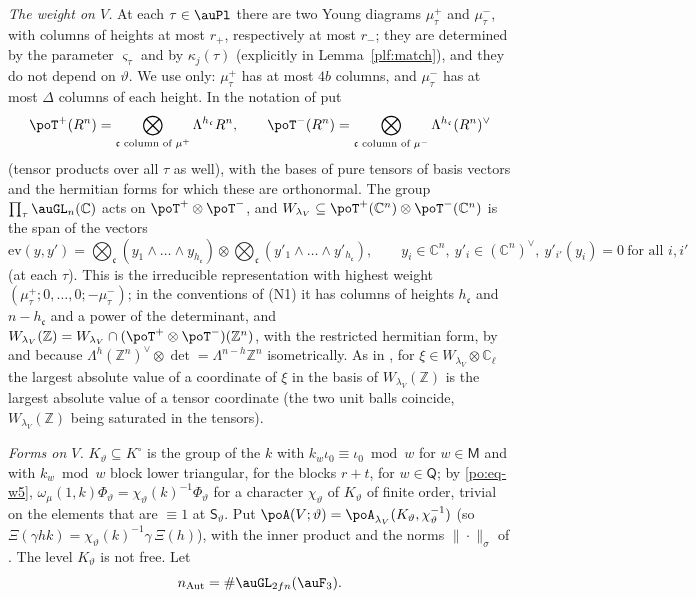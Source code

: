\documentclass[10pt]{amsart}
\theoremstyle{definition}
\theoremstyle{remark}
\newcommand{\C}{\mathbb C}
\newcommand{\Z}{\mathbb Z}
\begin{document}
\emph{The weight on $V$.} At each $\tau\in\auPl$ there are two Young diagrams $\mu^+_\tau$ and
$\mu^-_\tau$, with columns of heights at most $r_+$, respectively at most $r_-$; they are
determined by the parameter $\varsigma_\tau$ and by $\kappa_j(\tau)$ (explicitly in Lemma~\ref{plf:match}), and they do not depend on
$\vartheta$. We use only: $\mu^+_\tau$ has at most $4b$ columns, and $\mu^-_\tau$ has at most
$\Delta$ columns of each height. In the notation of {\cite[\S5.2.6]{P49}} put
\[
\poT^+(R^n)=\bigotimes_{\mathfrak c\text{ column of }\mu^+}\Lambda^{h_{\mathfrak c}}R^n,\qquad
\poT^-(R^n)=\bigotimes_{\mathfrak c\text{ column of }\mu^-}\Lambda^{h_{\mathfrak c}}(R^n)^\vee
\]
(tensor products over all $\tau$ as well), with the bases of pure tensors of basis vectors and the
hermitian forms for which these are orthonormal. The group $\prod_\tau\auGL_n(\C)$ acts on
$\poT^+\otimes\poT^-$, and $W_{\lambda_V}\subseteq\poT^+(\C^n)\otimes\poT^-(\C^n)$ is the span of
the vectors
\begin{equation}\label{po:eq-ev}
\mathrm{ev}(y,y')=\bigotimes_{\mathfrak c}(y_1\wedge\dots\wedge y_{h_{\mathfrak c}})\otimes
\bigotimes_{\mathfrak c}(y'_1\wedge\dots\wedge y'_{h_{\mathfrak c}}),\qquad y_i\in\C^n,\ y'_i\in
(\C^n)^\vee,\ y'_{i'}(y_i)=0\ \text{for all }i,i'
\end{equation}
(at each $\tau$). This is the irreducible representation with highest weight
$(\mu^+_\tau;0,\dots,0;-\mu^-_\tau)$; in the conventions of (N1) it has columns of heights
$h_{\mathfrak c}$ and $n-h_{\mathfrak c}$ and a power of the determinant, and
$W_{\lambda_V}(\Z)=W_{\lambda_V}\cap(\poT^+\otimes\poT^-)(\Z^n)$, with the restricted hermitian
form, by {\cite[(51)]{P49}} and because $\Lambda^h(\Z^n)^\vee\otimes\det=\Lambda^{n-h}\Z^n$
isometrically. As in {\cite[\S5.2.6]{P49}}, for $\xi\in W_{\lambda_V}\otimes\C_\ell$ the largest
absolute value of a coordinate of $\xi$ in the basis of $W_{\lambda_V}(\Z)$ is the largest
absolute value of a tensor coordinate (the two unit balls coincide, $W_{\lambda_V}(\Z)$ being
saturated in the tensors).

\emph{Forms on $V$.} $K_\vartheta\subseteq K^\circ$ is the group of the $k$ with $k_w\iota_0\equiv
\iota_0\bmod w$ for $w\in\mathsf M$ and with $k_w\bmod w$ block lower triangular, for the blocks
$r+t$, for $w\in\mathsf Q$; by \eqref{po:eq-w5}, $\omega_\mu(1,k)\Phi_\vartheta=\chi_\vartheta(k)^{-1}
\Phi_\vartheta$ for a character $\chi_\vartheta$ of $K_\vartheta$ of finite order, trivial on the
elements that are $\equiv1$ at $\mathsf S_\vartheta$. Put
$\poA(V;\vartheta)=\poA_{\lambda_V}(K_\vartheta,\chi_\vartheta^{-1})$ (so $\Xi(\gamma hk)=\chi_\vartheta(k)^{-1}\gamma\,\Xi(h)$), with the inner product and the
norms $\|\cdot\|_\sigma$ of {\cite[\S14.3]{P46}}. The level $K_\vartheta$ is not free. Let
\[
n_{\mathrm{Aut}}=\#\auGL_{2fn}(\auF_3).
\]
\end{document}
